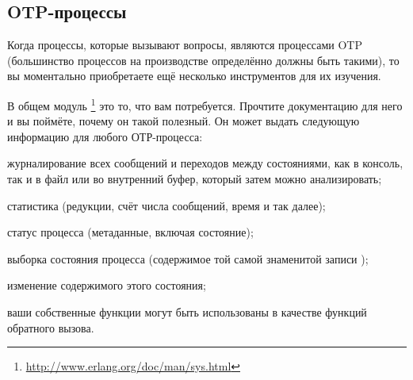 \documentclass[11pt, oneside]{book}   	%
\begin{document}
\subsection{OTP-процессы}

Когда процессы, которые вызывают вопросы, являются процессами OTP (большинство процессов на производстве определённо должны быть такими), то вы моментально приобретаете ещё несколько инструментов для их изучения.

В общем модуль \footnote{\href{http://www.erlang.org/doc/man/sys.html}{http://www.erlang.org/doc/man/sys.html}} это то, что вам потребуется. Прочтите документацию для него и вы поймёте, почему он такой полезный. Он может выдать следующую информацию для любого ОТР-процесса:

\begin{itemize*}
	\item журналирование всех сообщений и переходов между состояниями, как в консоль, так и в файл или во внутренний буфер, который затем можно анализировать;
	\item статистика (редукции, счёт числа сообщений, время и так далее);
	\item статус процесса (метаданные, включая состояние);
	\item выборка состояния процесса (содержимое той самой знаменитой записи );
	\item изменение содержимого этого состояния;
	\item ваши собственные функции могут быть использованы в качестве функций обратного вызова.
\end{itemize*}
\end{document}
